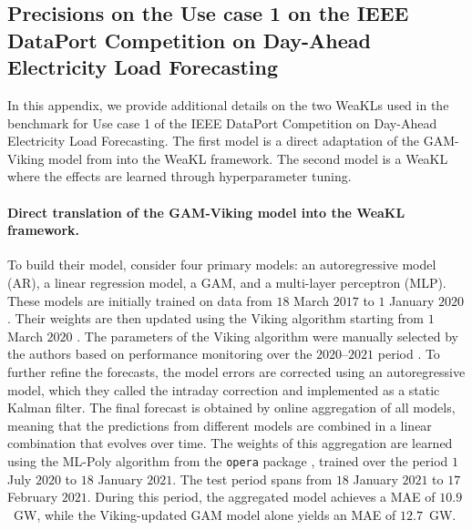 \subsection{Precisions on the Use case 1 on the IEEE DataPort Competition on Day-Ahead Electricity Load Forecasting}
\label{sec:case_study1}
In this appendix, we provide additional details on the two WeaKLs used in the benchmark for Use case 1 of the IEEE DataPort Competition on Day-Ahead Electricity Load Forecasting. The first model is a direct adaptation of the GAM-Viking model from \citet{vilmarest2022state} into the WeaKL framework. The second model is a WeaKL where the effects are learned through hyperparameter tuning.
\paragraph{Direct translation of the GAM-Viking model into the WeaKL framework.} 


To build their model, \citet{vilmarest2022state} consider four primary models: an autoregressive model (AR), a linear regression model, a GAM, and a multi-layer perceptron (MLP). 
These models are initially trained on data from $18$ March $2017$ to $1$ January $2020$. 
Their weights are then updated using the Viking algorithm starting from $1$ March $2020$ \citep[][Table~3]{vilmarest2022state}. 
The parameters of the Viking algorithm were manually selected by the authors based on performance monitoring over the $2020$–$2021$ period \citep[][Figure7]{vilmarest2022state}. 
To further refine the forecasts, the model errors are corrected using an autoregressive model, which they called the intraday correction and implemented as a static Kalman filter. The final forecast is obtained by online aggregation of all models, meaning that the predictions from different models are combined in a linear combination that evolves over time. The weights of this aggregation are learned using the ML-Poly algorithm from the \texttt{opera} package \citep{gaillard2016opera}, trained over the period $1$ July $2020$ to $18$ January $2021$. 
The test period spans from $18$ January $2021$ to $17$ February $2021$. 
During this period, the aggregated model achieves a MAE of $10.9$~GW, while the Viking-updated GAM model alone yields an MAE of $12.7$~GW.

